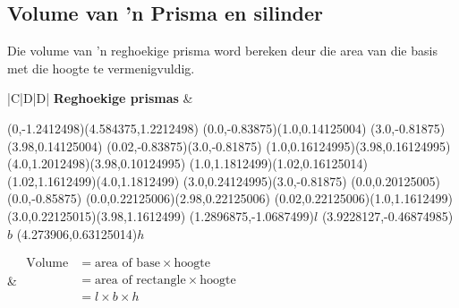 \subsection{Volume van ’n Prisma en silinder}
Die volume van ’n reghoekige prisma word bereken deur die area van die basis met die hoogte te vermenigvuldig. 




\begin{table}[h]
\begin{tabular}{|C|D|D|}
\hline
\textbf{ Reghoekige prismas}
&
\begin{center}
\begin{pspicture}(0,-1.2412498)(4.584375,1.2212498)
\psline[linewidth=0.04cm](0.0,-0.83875)(1.0,0.14125004)
\psline[linewidth=0.04cm](3.0,-0.81875)(3.98,0.14125004)
\psline[linewidth=0.04cm](0.02,-0.83875)(3.0,-0.81875)
\psline[linewidth=0.04cm](1.0,0.16124995)(3.98,0.16124995)
\psline[linewidth=0.04cm](4.0,1.2012498)(3.98,0.10124995)
\psline[linewidth=0.04cm](1.0,1.1812499)(1.02,0.16125014)
\psline[linewidth=0.04cm](1.02,1.1612499)(4.0,1.1812499)
\psline[linewidth=0.04cm](3.0,0.24124995)(3.0,-0.81875)
\psline[linewidth=0.04cm](0.0,0.20125005)(0.0,-0.85875)
\psline[linewidth=0.04cm](0.0,0.22125006)(2.98,0.22125006)
\psline[linewidth=0.04cm](0.02,0.22125006)(1.0,1.1612499)
\psline[linewidth=0.04cm](3.0,0.22125015)(3.98,1.1612499)
\rput(1.2896875,-1.0687499){$l$}
\rput(3.9228127,-0.46874985){$b$}
\rput(4.273906,0.63125014){$h$}
\end{pspicture}
\end{center} 
&
$
\begin{aligned}
\mbox{Volume} &= \mbox{area of base} \times \mbox{hoogte} \\
                &= \mbox{area of rectangle} \times \mbox{hoogte} \\
                &= l \times b \times h \\
\end{aligned}$   \\ \hline



\end{tabular}
\end{table}
